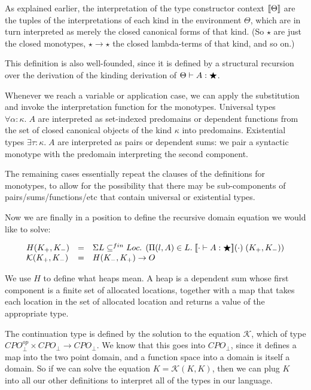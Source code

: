 As explained earlier, the interpretation of the type constructor
context $\interp{\Theta}$ are the tuples of the interpretations of
each kind in the environment $\Theta$, which are in turn interpreted
as merely the closed canonical forms of that kind. (So $\star$ are
just the closed monotypes, $\star \to \star$ the closed lambda-terms
of that kind, and so on.)

This definition is also well-founded, since it is defined by a
structural recursion over the derivation of the kinding derivation of
$\judgeWK{A}{\bigstar}$.

Whenever we reach a variable or application case, we can apply the
substitution and invoke the interpretation function for the
monotypes. Universal types $\forall \alpha:\kappa.\;A$ are interpreted
as set-indexed predomains or dependent functions from the set of
closed canonical objects of the kind $\kappa$ into
predomains. Existential types $\exists \tau:\kappa.\;A$ are
interpreted as pairs or dependent sums: we pair a syntactic monotype
with the predomain interpreting the second component.

The remaining cases essentially repeat the clauses of the definitions
for monotypes, to allow for the possibility that there may be
sub-components of pairs/sums/functions/etc that contain universal or
existential types.

Now we are finally in a position to define the recursive domain equation we 
would like to solve:

\begin{displaymath}
\begin{array}{lcl}
H(K_+,K_-) & = & \Sigma L \subseteq^{fin} Loc.\; 
                    \left(\Pi (l,A) \in L.\; 
                             \interp{\judgeWK[\cdot]{A}{\bigstar}}(\cdot)\;(K_+,K_-) 
                    \right)\\

\mathcal{K}(K_+,K_-) & = & H(K_-,K_+) \to O \\    
\end{array}
\end{displaymath}

We use $H$ to define what heaps mean. A heap is a dependent sum whose
first component is a finite set of allocated locations, together with
a map that takes each location in the set of allocated location and
returns a value of the appropriate type.

The continuation type is defined by the solution to the equation
$\mathcal{K}$, which of type $CPO^{op}_\bot \times CPO_\bot \to
CPO_\bot$. We know that this goes into $CPO_\bot$, since it defines a
map into the two point domain, and a function space into a domain is
itself a domain. So if we can solve the equation $K = \mathcal{K}(K,
K)$, then we can plug $K$ into all our other definitions to interpret
all of the types in our language.

